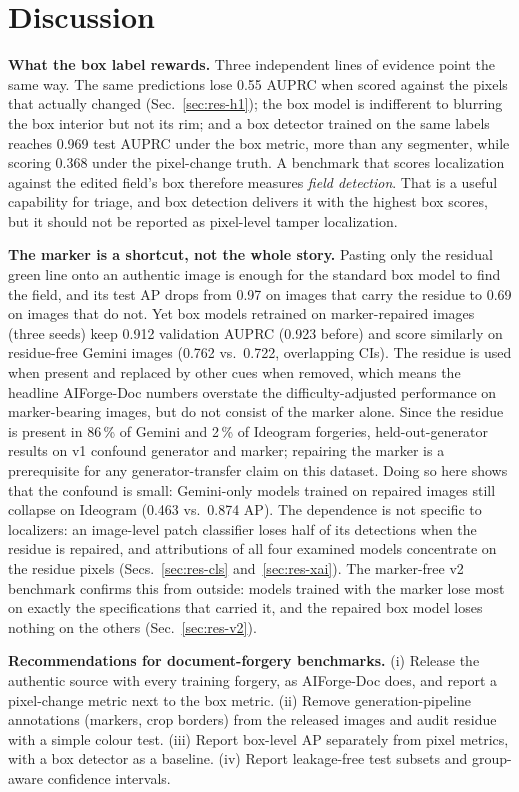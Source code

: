 \section{Discussion}
\label{sec:discussion}
\textbf{What the box label rewards.} Three independent lines of evidence point the same way. The same predictions lose 0.55 AUPRC when scored against the pixels that actually changed (Sec.~\ref{sec:res-h1}); the box model is indifferent to blurring the box interior but not its rim; and a box detector trained on the same labels reaches 0.969 test AUPRC under the box metric, more than any segmenter, while scoring 0.368 under the pixel-change truth. A benchmark that scores localization against the edited field's box therefore measures \emph{field detection}. That is a useful capability for triage, and box detection delivers it with the highest box scores, but it should not be reported as pixel-level tamper localization.

\textbf{The marker is a shortcut, not the whole story.} Pasting only the residual green line onto an authentic image is enough for the standard box model to find the field, and its test AP drops from 0.97 on images that carry the residue to 0.69 on images that do not. Yet box models retrained on marker-repaired images (three seeds) keep 0.912 validation AUPRC (0.923 before) and score similarly on residue-free Gemini images (0.762 vs.\ 0.722, overlapping CIs). The residue is used when present and replaced by other cues when removed, which means the headline AIForge-Doc numbers overstate the difficulty-adjusted performance on marker-bearing images, but do not consist of the marker alone. Since the residue is present in 86\,\% of Gemini and 2\,\% of Ideogram forgeries, held-out-generator results on v1 confound generator and marker; repairing the marker is a prerequisite for any generator-transfer claim on this dataset. Doing so here shows that the confound is small: Gemini-only models trained on repaired images still collapse on Ideogram (0.463 vs.\ 0.874 AP). The dependence is not specific to localizers: an image-level patch classifier loses half of its detections when the residue is repaired, and attributions of all four examined models concentrate on the residue pixels (Secs.~\ref{sec:res-cls} and~\ref{sec:res-xai}). The marker-free v2 benchmark confirms this from outside: models trained with the marker lose most on exactly the specifications that carried it, and the repaired box model loses nothing on the others (Sec.~\ref{sec:res-v2}).

\textbf{Recommendations for document-forgery benchmarks.} (i) Release the authentic source with every training forgery, as AIForge-Doc does, and report a pixel-change metric next to the box metric. (ii) Remove generation-pipeline annotations (markers, crop borders) from the released images and audit residue with a simple colour test. (iii) Report box-level AP separately from pixel metrics, with a box detector as a baseline. (iv) Report leakage-free test subsets and group-aware confidence intervals.

